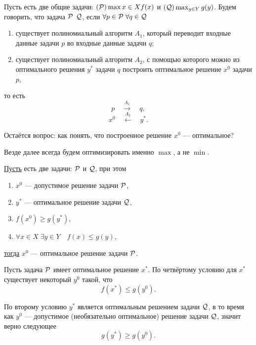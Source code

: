 Пусть есть две общие задачи: $(\P) \max{x \in X} f(x)$ и $(\Q) \max_{y \in Y} g(y)$. Будем говорить, что задача $\P$  $\Q$, если $\forall p \in \P \; \forall q \in \Q$

\begin{enumerate}[nosep]
	\item существует полиномиальный алгоритм $A_1$, который переводит входные данные задачи $p$ во входные данные задачи $q$;
	
	\item существует полиномиальный алгоритм $A_2$, с помощью которого можно из оптимального решения $y^*$ задачи $q$ построить оптимальное решение $x^0$ задачи $p$,
\end{enumerate}

то есть
\[
p \quad \stackrel{A_1}{\longrightarrow} \quad q,
\]
\[
x^0 \quad \stackrel{A_2}{\longleftarrow} \quad y^*.
\]

Остаётся вопрос: как понять, что построенное решение $x^0$ --- оптимальное?

\remark

Везде далее всегда будем оптимизировать именно $\max$, а не $\min$.

\label{fact:reduction_to_other_problem}

\underline{Пусть} есть две задачи: $\P$ и $\Q$, при этом
\begin{enumerate}[nosep]
	\item $x^0$ --- допустимое решение задачи $\P$,
	
	\item $y^*$ --- оптимальное решение задачи $\Q$,
	
	\item $f(x^0) \ge g(y^*)$,
	
	\item $\forall x \in X \; \exists y \in Y \quad f(x) \le g(y)$,
\end{enumerate}

\underline{тогда} $x^0$ --- оптимальное решение задачи $\P$.

\prooof

Пусть задача $\P$ имеет оптимальное решение $x^*$. По четвёртому условию для $x^*$ существует некоторый $y^0$ такой, что 
\[
f(x^*) \le g(y^0). \tag{*}
\]

По второму условию $y^*$ является оптимальным решением задачи $\Q$, в то время как $y^0$ --- допустимое (необязательно оптимальное) решение задачи $\Q$, значит верно следующее
\[
g(y^*) \ge g(y^0). \tag{**}
\]


